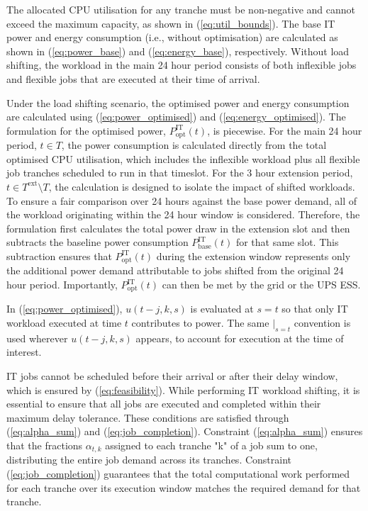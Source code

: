 \documentclass[lettersize,journal]{IEEEtran}
\begin{document}
The allocated CPU utilisation for any tranche must be non-negative and cannot exceed the maximum capacity, as shown in (\ref{eq:util_bounds}). The base IT power and energy consumption (i.e., without optimisation) are calculated as shown in (\ref{eq:power_base}) and (\ref{eq:energy_base}), respectively. Without load shifting, the workload in the main 24 hour period consists of both inflexible jobs and flexible jobs that are executed at their time of arrival.

Under the load shifting scenario, the optimised power and energy consumption are calculated using (\ref{eq:power_optimised}) and (\ref{eq:energy_optimised}). The formulation for the optimised power, $P^{\mathrm{IT}}_{\mathrm{opt}}(t)$, is piecewise. For the main 24 hour period, $t \in T$, the power consumption is calculated directly from the total optimised CPU utilisation, which includes the inflexible workload plus all flexible job tranches scheduled to run in that timeslot. For the 3 hour extension period, $t \in T^{\text{ext}} \setminus T$, the calculation is designed to isolate the impact of shifted workloads. To ensure a fair comparison over 24 hours against the base power demand, all of the workload originating within the 24 hour window is considered. Therefore, the formulation first calculates the total power draw in the extension slot and then subtracts the baseline power consumption $P^{\mathrm{IT}}_{\mathrm{base}}(t)$ for that same slot. This subtraction ensures that $P^{\mathrm{IT}}_{\mathrm{opt}}(t)$ during the extension window represents only the additional power demand attributable to jobs shifted from the original 24 hour period. Importantly, $P^{\mathrm{IT}}_{\mathrm{opt}}(t)$ can then be met by the grid or the UPS ESS.

In (\ref{eq:power_optimised}), $u(t\!-\!j,k,s)$ is evaluated at $s=t$  so that only IT workload executed at time $t$ contributes to power. The same $|_{s=t}$ convention is used wherever $u(t\!-\!j,k,s)$ appears, to account for execution at the time of interest.

IT jobs cannot be scheduled before their arrival or after their delay window, which is ensured by (\ref{eq:feasibility}). While performing IT workload shifting, it is essential to ensure that all jobs are executed and completed within their maximum delay tolerance. These conditions are satisfied through (\ref{eq:alpha_sum}) and (\ref{eq:job_completion}). Constraint (\ref{eq:alpha_sum}) ensures that the fractions $\alpha_{t,k}$ assigned to each tranche "k" of a job sum to one, distributing the entire job demand across its tranches. Constraint (\ref{eq:job_completion}) guarantees that the total computational work performed for each tranche over its execution window matches the required demand for that tranche.
\end{document}
